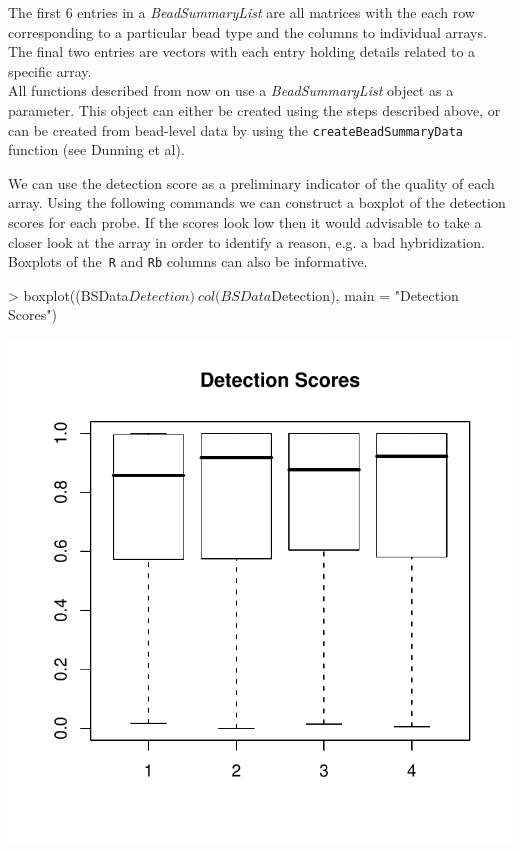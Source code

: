 \documentclass[a4paper]{article}
\newcommand{\Robject}[1]{{\texttt{#1}}}
\newcommand{\Rfunction}[1]{{\texttt{#1}}}
\newcommand{\Rclass}[1]{{\textit{#1}}}
\begin{document}
The first 6 entries in a \Rclass{BeadSummaryList} are all matrices with the each row corresponding to a particular bead type and the columns to individual arrays.  The final two entries are vectors with each entry holding details related to a specific array. \\

All functions described from now on use a \Rclass{BeadSummaryList} object as a parameter. This object can either be created using the steps described above, or can be created from bead-level data by using 
the \Rfunction{createBeadSummaryData} function (see Dunning et al).

We can use the detection score as a preliminary indicator of the quality of each array.  Using the following commands we can construct a boxplot of the detection scores for each probe.  If the scores look low then it would advisable to take a closer look at the array in order to identify a reason, e.g. a bad hybridization. Boxplots of the\Robject{ R} and \Robject{Rb} columns can also be informative.

\begin{center}
\begin{Schunk}
\begin{Sinput}
> boxplot((BSData$Detection) ~ col(BSData$Detection), main = "Detection Scores")
\end{Sinput}
\end{Schunk}
\includegraphics{bead-vignette-31}
\end{center}
\end{document}
